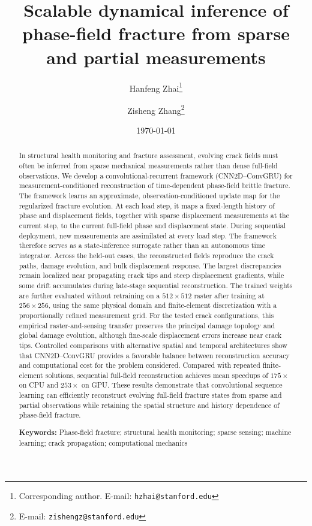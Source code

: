 \documentclass[10pt]{article}
\title{Scalable dynamical inference of phase-field fracture from sparse and partial measurements}
\author[1]{Hanfeng Zhai\thanks{Corresponding author. E-mail: \tt hzhai@stanford.edu}}
\author[2]{Zisheng Zhang\thanks{E-mail: \tt zishengz@stanford.edu}}
\affil[1]{Department of Mechanical Engineering, Stanford University, Stanford, CA 94305, USA}
\affil[2]{Department of Chemical Engineering, Stanford University, Stanford, CA 94305, USA}
\date{\today}
\theoremstyle{definition}
\begin{document}
\maketitle



\begin{abstract}

In structural health monitoring and fracture assessment, evolving crack fields must often be inferred from sparse mechanical measurements rather than dense full-field observations.
%
We develop a convolutional-recurrent framework (CNN2D--ConvGRU) for measurement-conditioned reconstruction of time-dependent phase-field brittle fracture.
%
The framework learns an approximate, observation-conditioned update map for the regularized fracture evolution.
%
At each load step, it maps a fixed-length history of phase and displacement fields, together with sparse displacement measurements at the current step, to the current full-field phase and displacement state.
%
During sequential deployment, new measurements are assimilated at every load step. The framework therefore serves as a state-inference surrogate rather than an autonomous time integrator.
%
%
Across the held-out cases, the reconstructed fields reproduce the crack paths, damage evolution, and bulk displacement response.
%
The largest discrepancies remain localized near propagating crack tips and steep displacement gradients, while some drift accumulates during late-stage sequential reconstruction.
%
The trained weights are further evaluated without retraining on a $512 \times 512$ raster after training at $256 \times 256$, using the same physical domain and finite-element discretization with a proportionally refined measurement grid.
%
For the tested crack configurations, this empirical raster-and-sensing transfer preserves the principal damage topology and global damage evolution, although fine-scale displacement errors increase near crack tips.
%
Controlled comparisons with alternative spatial and temporal architectures show that CNN2D--ConvGRU provides a favorable balance between reconstruction accuracy and computational cost for the problem considered.
%
Compared with repeated finite-element solutions, sequential full-field reconstruction achieves mean speedups of $175\times$ on CPU and $253\times$ on GPU.
%
These results demonstrate that convolutional sequence learning can efficiently reconstruct evolving full-field fracture states from sparse and partial observations while retaining the spatial structure and history dependence of phase-field fracture.
\vspace{8pt}

\noindent\textbf{Keywords:} Phase-field fracture; structural health monitoring; sparse sensing; machine learning; crack propagation; computational mechanics
\end{abstract}
\end{document}
